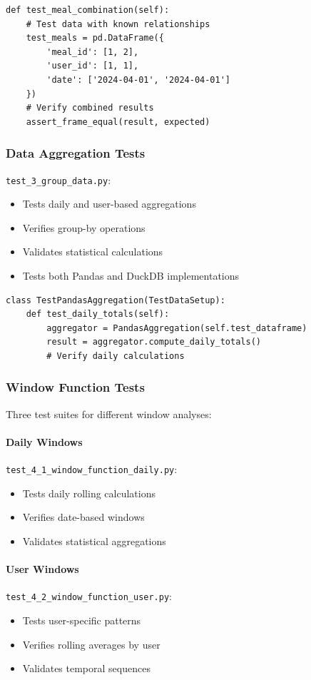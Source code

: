 \begin{lstlisting}[style=pythonstyle, caption=Meal Combination Test Example]
def test_meal_combination(self):
    # Test data with known relationships
    test_meals = pd.DataFrame({
        'meal_id': [1, 2],
        'user_id': [1, 1],
        'date': ['2024-04-01', '2024-04-01']
    })
    # Verify combined results
    assert_frame_equal(result, expected)
\end{lstlisting}

\subsubsection{Data Aggregation Tests}
\texttt{test\_3\_group\_data.py}:
\begin{itemize}
    \item Tests daily and user-based aggregations
    \item Verifies group-by operations
    \item Validates statistical calculations
    \item Tests both Pandas and DuckDB implementations
\end{itemize}

\begin{lstlisting}[style=pythonstyle, caption=Aggregation Test Example]
class TestPandasAggregation(TestDataSetup):
    def test_daily_totals(self):
        aggregator = PandasAggregation(self.test_dataframe)
        result = aggregator.compute_daily_totals()
        # Verify daily calculations
\end{lstlisting}

\subsubsection{Window Function Tests}
Three test suites for different window analyses:

\paragraph{Daily Windows} \texttt{test\_4\_1\_window\_function\_daily.py}:
\begin{itemize}
    \item Tests daily rolling calculations
    \item Verifies date-based windows
    \item Validates statistical aggregations
\end{itemize}

\paragraph{User Windows} \texttt{test\_4\_2\_window\_function\_user.py}:
\begin{itemize}
    \item Tests user-specific patterns
    \item Verifies rolling averages by user
    \item Validates temporal sequences
\end{itemize}

